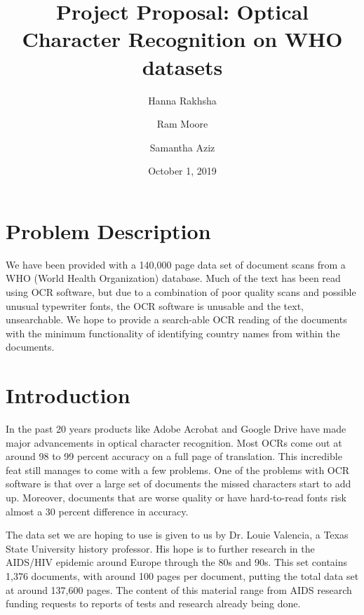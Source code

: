 \documentclass{article}
\title{Project Proposal: Optical Character Recognition on WHO datasets}
\author{Hanna Rakhsha \and Ram Moore \and Samantha Aziz}
\date{October 1, 2019}
\begin{document}
\maketitle

\section{Problem Description}
We have been provided with a 140,000 page data set of document scans from a WHO (World Health Organization) database.
Much of the text has been read using OCR software, but due to a combination of poor quality scans and possible unusual typewriter fonts, the OCR software is unusable and the text, unsearchable.
We hope to provide a search-able OCR reading of the documents with the minimum functionality of identifying country names from within the documents.

\section{Introduction}
In the past 20 years products like Adobe Acrobat and Google Drive have made major advancements in optical character recognition.
Most OCRs come out at around 98 to 99 percent accuracy on a full page of translation. \citep{Council}
This incredible feat still manages to come with a few problems.
One of the problems with OCR software is that over a large set of documents the missed characters start to add up.
Moreover, documents that are worse quality or have hard-to-read fonts risk almost a 30 percent difference in accuracy. \citep{Holley}

The data set we are hoping to use is given to us by Dr. Louie Valencia, a Texas State University history professor.
His hope is to further research in the AIDS/HIV epidemic around Europe through the 80s and 90s.
This set contains 1,376 documents, with around 100 pages per document, putting the total data set at around 137,600 pages.
The content of this material range from AIDS research funding requests to reports of tests and research already being done.
\end{document}
